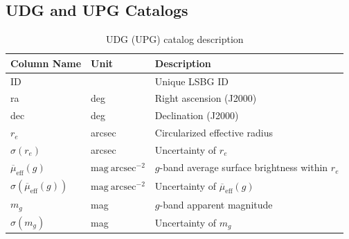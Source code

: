 \documentclass[twocolumn,astrosymb,twocolappendix]{aastex631}
\newcommand{\sbunit}{\mathrm{mag\ arcsec}^{-2}}
\begin{document}
\begin{CJK*}{UTF8}{gbsn}



\section{UDG and UPG Catalogs}
\onecolumngrid 

\begin{table}
\caption{UDG (UPG) catalog description} 
\label{tab:catalog}
\begin{center}
\begin{tabular}{l l l}
\hline\hline
Column Name      & Unit    & Description                    \\
\hline
ID                       &         & Unique LSBG ID \\
ra                       & deg     & Right ascension (J2000) \\
dec                      & deg     & Declination (J2000) \\
$r_e$         & arcsec  & Circularized effective radius  \\
$\sigma(r_e)$ & arcsec  & Uncertainty of $r_e$ \\
$\overline{\mu}_{\mathrm{eff}}(g)$               & $\sbunit$ & $g$-band average surface brightness within $r_e$ \\
$\sigma(\overline{\mu}_{\mathrm{eff}}(g))$       & $\sbunit$ & Uncertainty of $\overline{\mu}_{\mathrm{eff}}(g)$           \\
$m_g$                    & mag     & $g$-band apparent magnitude     \\
$\sigma(m_g)$            & mag     & Uncertainty of $m_g$            \\

\end{tabular}
\end{center}
\end{table}
\end{CJK*}
\end{document}
